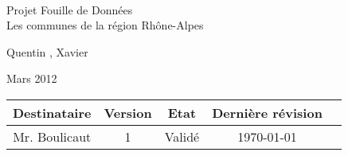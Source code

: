 \documentclass[a4paper]{article}
\begin{document}
\begin{titlepage}
~
\vfill
\begin{center}
\begin{Huge}
Projet Fouille de Données\\ Les communes de la région Rhône-Alpes \end{Huge}
\vfill
Quentin , Xavier \\
\vfill
\begin{Large}
Mars 2012
\end{Large}
\vfill
\begin{tabular}{|c|c|c|c|c|}
  \hline
   Destinataire & Version & Etat & Dernière révision \\
   \hline
   Mr. Boulicaut & 1 & Validé & \today \\
   \hline
\end{tabular}
\end{center}
\vfill
\end{titlepage}
\newpage
\tableofcontents
\newpage




\end{document}
